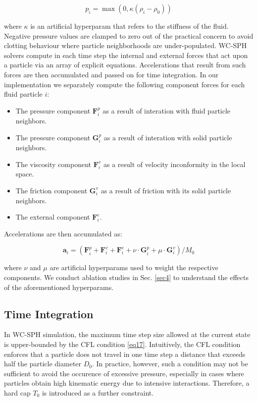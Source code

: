\documentclass[
	11pt, 
	DIV10,
	ngerman,
	a4paper, 
	oneside, 
	headings=normal, 
	captions=tableheading,
	final, 
	numbers=noenddot
]{scrartcl}
\begin{document}
\begin{equation}
	\label{eq14}
    p_{i} = \max(0, \kappa(\rho_{i} - \rho_{0}))
\end{equation}

where $ \kappa $ is an artificial hyperparam that refers to the stiffness of the fluid. Negative pressure values are clamped to zero out of the practical concern to avoid clotting behaviour where particle neighborhoods are under-populated. WC-SPH solvers compute in each time step the internal and external forces that act upon a particle via an array of explicit equations. Accelerations that result from such forces are then accumulated and passed on for time integration. In our implementation we separately compute the following component forces for each fluid particle $ i $:

\begin{itemize}
    \item The pressure component $ \mathbf{F}_{i}^{p} $ as a result of interation with fluid particle neighbors.
    \item The pressure component $ \mathbf{G}_{i}^{p} $ as a result of interation with solid particle neighbors.
    \item The viscosity component $ \mathbf{F}_{i}^{v} $ as a result of velocity inconformity in the local space.
    \item The friction component $ \mathbf{G}_{i}^{v} $ as a result of friction with its solid particle neighbors.
    \item The external component $ \mathbf{F}_{i}^{e} $.
\end{itemize}

Accelerations are then accumulated as:

\begin{equation}
	\label{eq15}
	\boldsymbol{a}_{i} = \left(\mathbf{F}_{i}^{p} + \mathbf{F}_{i}^{v} + \mathbf{F}_{i}^{e} + \nu \cdot \mathbf{G}_{i}^{p} + \mu \cdot \mathbf{G}_{i}^{v} \right) / M_{0}
\end{equation}

where $ \nu $ and $ \mu $ are artificial hyperparams used to weight the respective components. We conduct ablation studies in Sec. \ref{sec4} to understand the effects of the aforementioned hyperparams.

\subsection{Time Integration}

In WC-SPH simulation, the maximum time step size allowed at the current state is upper-bounded by the CFL condition \eqref{eq17}. Intuitively, the CFL condition enforces that a particle does not travel in one time step a distance that exceeds half the particle diameter $ D_{0} $. In practice, however, such a condition may not be sufficient to avoid the occurence of excessive pressure, especially in cases where particles obtain high kinematic energy due to intensive interactions. Therefore, a hard cap $ T_{0} $ is introduced as a further constraint.
\end{document}
